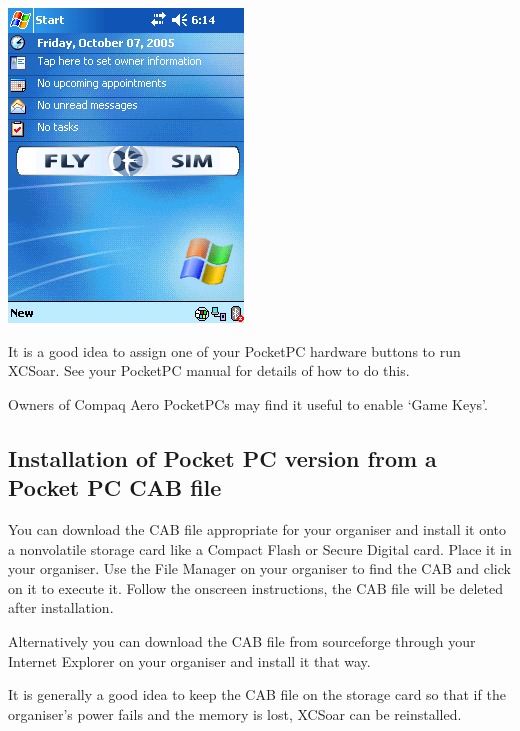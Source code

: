 \documentclass[a4paper,12pt]{refrep}
\begin{document}
\begin{enumerate}
\begin{center}
\includegraphics[angle=0,width=0.6\linewidth,keepaspectratio='true']{figures/XCS_Today.png}
\end{center}

\end{enumerate}

It is a good idea to assign one of your PocketPC hardware buttons to
run XCSoar. See your PocketPC manual for details of how to do this.

Owners of Compaq Aero PocketPCs may find it useful to enable `Game
Keys'.

\subsection*{Installation of Pocket PC version from a Pocket PC CAB file}

You can download the CAB file appropriate for your organiser and
install it onto a nonvolatile storage card like a Compact Flash or
Secure Digital card. Place it in your organiser. Use the File Manager
on your organiser to find the CAB and click on it to execute
it. Follow the onscreen instructions, the CAB file will be deleted
after installation.

Alternatively you can download the CAB file from sourceforge through
your Internet Explorer on your organiser and install it that way.

\tip It is generally a good idea to keep the CAB file on the storage card
so that if the organiser's power fails and the memory is lost, XCSoar
can be reinstalled.
\end{document}
